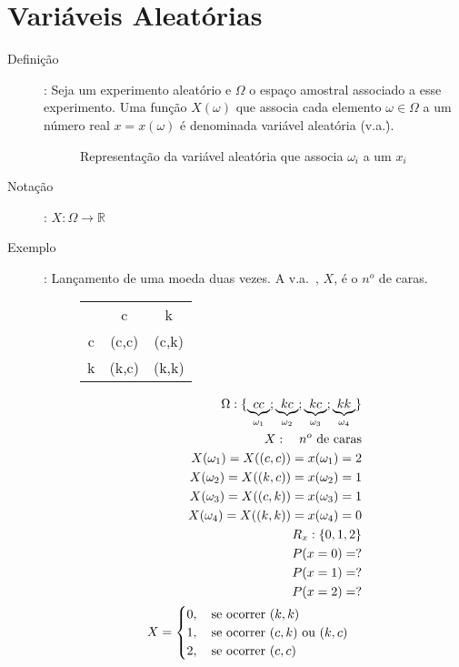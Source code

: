    \section{Variáveis Aleatórias}
   \begin{description}
     \item [Definição]: Seja um experimento aleatório e $\Omega$ o espaço amostral associado 
       a esse experimento. Uma função $X(\omega)$ que associa cada elemento $\omega \in
       \Omega$ a um número real $x=x(\omega)$ é denominada variável aleatória (v.a.\.). 
       \begin{figure}[H]
         \centering
         
         \caption{Representação da variável aleatória que associa $\omega_i$ a um $x_i$}
         \label{fig:23}
       \end{figure}
     \item [Notação]: $X:\Omega \to \mathbb{R}$

     \item [Exemplo]: Lançamento de uma moeda duas vezes. A v.a.\ , $X$, é o $n^o$ de caras. 
       \begin{figure} [H]
         \centering
         \begin{tabular}{c c c}
           \toprule
           &c&k\\ \cmidrule{2-3}
           c&(c,c)&(c,k)\\ \cmidrule{2-3}
           k&(k,c)&(k,k)\\    \bottomrule
         \end{tabular}
         \label{tab:3}
       \end{figure}

       \begin{align*}
         \Omega : \{ \underbrace{cc}_{\omega_1};\underbrace{kc}_{\omega_2};\underbrace{kc}_{\omega_3};\underbrace{kk}_{\omega_4} \}\\
         X: \text{\quad $n^o$ de caras}\\
         X(\omega_1)= X((c,c))= x(\omega_1)=2\\
         X(\omega_2)= X((k,c))= x(\omega_2)=1\\
         X(\omega_3)= X((c,k))= x(\omega_3)=1\\
         X(\omega_4)= X((k,k))= x(\omega_4)=0\\
         R_x: \{0,1,2 \}\\
         P(x=0)=?\\
         P(x=1)=? \\
         P(x=2)=? \\
         X=
         \begin{cases}
           0, \text{\quad se ocorrer $(k,k)$} \\
           1, \text{\quad se ocorrer $(c,k)$ ou $(k,c)$} \\
           2,\text{\quad se ocorrer $(c,c)$}
         \end{cases}
       \end{align*}


\end{description}
